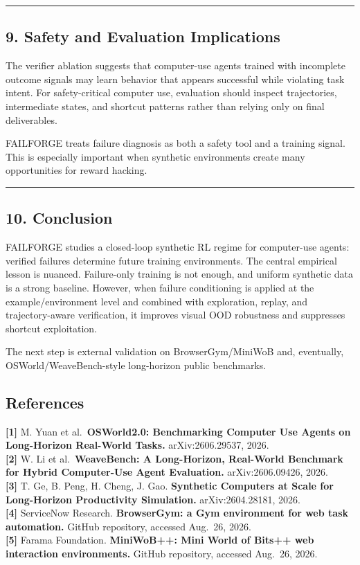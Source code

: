 \documentclass[
]{article}
\begin{document}
\begin{center}\rule{0.5\linewidth}{0.5pt}\end{center}

\subsection{9. Safety and Evaluation
Implications}\label{safety-and-evaluation-implications}

The verifier ablation suggests that computer-use agents trained with
incomplete outcome signals may learn behavior that appears successful
while violating task intent. For safety-critical computer use,
evaluation should inspect trajectories, intermediate states, and
shortcut patterns rather than relying only on final deliverables.

FAILFORGE treats failure diagnosis as both a safety tool and a training
signal. This is especially important when synthetic environments create
many opportunities for reward hacking.

\begin{center}\rule{0.5\linewidth}{0.5pt}\end{center}

\subsection{10. Conclusion}\label{conclusion}

FAILFORGE studies a closed-loop synthetic RL regime for computer-use
agents: verified failures determine future training environments. The
central empirical lesson is nuanced. Failure-only training is not
enough, and uniform synthetic data is a strong baseline. However, when
failure conditioning is applied at the example/environment level and
combined with exploration, replay, and trajectory-aware verification, it
improves visual OOD robustness and suppresses shortcut exploitation.

The next step is external validation on BrowserGym/MiniWoB and,
eventually, OSWorld/WeaveBench-style long-horizon public benchmarks.

\subsection{References}\label{references}

\textbf{[1]} M. Yuan et al.~\textbf{OSWorld2.0: Benchmarking Computer Use
Agents on Long-Horizon Real-World Tasks.} arXiv:2606.29537, 2026.\\
\textbf{[2]} W. Li et al.~\textbf{WeaveBench: A Long-Horizon, Real-World
Benchmark for Hybrid Computer-Use Agent Evaluation.} arXiv:2606.09426,
2026.\\
\textbf{[3]} T. Ge, B. Peng, H. Cheng, J. Gao. \textbf{Synthetic Computers at
Scale for Long-Horizon Productivity Simulation.} arXiv:2604.28181,
2026.\\
\textbf{[4]} ServiceNow Research. \textbf{BrowserGym: a Gym environment for
web task automation.} GitHub repository, accessed Aug.~26, 2026.\\
\textbf{[5]} Farama Foundation. \textbf{MiniWoB++: Mini World of Bits++ web
interaction environments.} GitHub repository, accessed Aug.~26, 2026.
\end{document}
